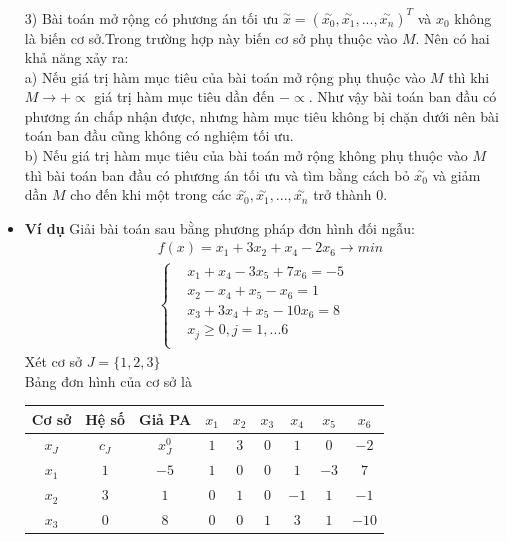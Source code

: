 \documentclass[12pt,a4paper]{report}
\begin{document}
\begin{itemize}
        3) Bài toán mở rộng có phương án tối ưu $\overset{\sim}{x}=(\overset{\sim}{x_0},\overset{\sim}{x_1},...,\overset{\sim}{x_n})^T$ và $x_0$ không là biến cơ sở.Trong trường hợp này biến cơ sở phụ thuộc vào $M$. Nên có hai khả năng xảy ra:\\
    a) Nếu giá trị hàm mục tiêu của bài toán mở rộng phụ thuộc vào $M$ thì khi $M 
    \to +\propto $ giá trị hàm mục tiêu dần đến $-\propto$. Như vậy bài toán ban đầu có phương án chấp nhận được, nhưng hàm mục tiêu không bị chặn dưới nên bài toán ban đầu cũng không có nghiệm tối ưu.\\
    b) Nếu giá trị hàm mục tiêu của bài toán mở rộng không phụ thuộc vào $M$ thì bài toán ban đầu có phương án tối ưu và tìm bằng cách bỏ $\overset{\sim}{x_0}$ và giảm dần $M$ cho đến khi một trong các $\overset{\sim}{x_0},\overset{\sim}{x_1},...,\overset{\sim}{x_n}$ trở thành $0$.\\
    \item \textbf{Ví dụ}
    Giải bài toán sau bằng phương pháp đơn hình đối ngẫu:\\
    \begin{equation*}
        \begin{split}
            &f(x)=x_1+3x_2+x_4 -2x_6 \to min\\
            &\left\{\begin{split}
                &x_1+   x_4-3x_5+7x_6=-5\\
                &   x_2-x_4+x_5-x_6=1\\
                &x_3+3x_4+x_5-10x_6=8\\
                &x_j \ge 0, j=1,...6\\
            \end{split}\right.
        \end{split}
    \end{equation*}
    Xét cơ sở $J=\{1,2,3\}$\\
    Bảng đơn hình của cơ sở là\\
    \begin{tabular}{|c|c|c|c|c|c|c|c|c|}
    \hline
       Cơ sở  & Hệ số & Giả PA& $x_1$ &$x_2$ &$x_3$ &$x_4$ &$x_5$ &$x_6$ \\
       \hline
         $x_J$ & $c_J$ & $x_J^0$ &$1$ &$3$ &$0$ &$1$ &$0$ &$-2$\\
         \hline
         $x_1$ &$1$ &$-5$ &$ 1$ &$0$ &$0$ &$1$ &$-3$ &$7$\\
         $x_2$ &$3$ &$1$ &$0$ &$1$ &$0$ &$-1$ &$1$ &$-1$\\
         $x_3$ &$0$ &$8$ &$0$ &$0$ &$1$ &$3$ &$1$ &$-10$\\

\end{tabular}
\end{itemize}
\end{document}
